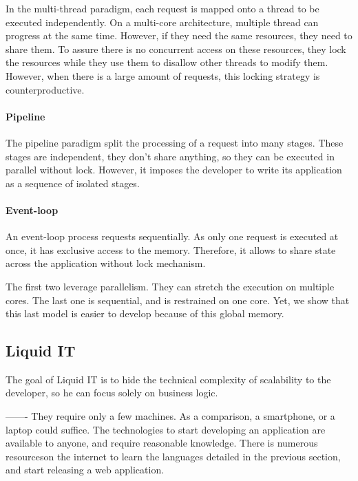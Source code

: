 In the multi-thread paradigm, each request is mapped onto a thread to be executed independently.
On a multi-core architecture, multiple thread can progress at the same time.
However, if they need the same resources, they need to share them.
To assure there is no concurrent access on these resources, they lock the resources while they use them to disallow other threads to modify them.
However, when there is a large amount of requests, this locking strategy is counterproductive.

\paragraph{Pipeline} %

The pipeline paradigm split the processing of a request into many stages.
These stages are independent, they don't share anything, so they can be executed in parallel without lock.
However, it imposes the developer to write its application as a sequence of isolated stages.

\paragraph{Event-loop}

An event-loop process requests sequentially.
As only one request is executed at once, it has exclusive access to the memory.
Therefore, it allows to share state across the application without lock mechanism.


The first two leverage parallelism.
They can stretch the execution on multiple cores.
The last one is sequential, and is restrained on one core.
Yet, we show that this last model is easier to develop because of this global memory.






\subsection{Liquid IT}

The goal of Liquid IT is to hide the technical complexity of scalability to the developer, so he can focus solely on business logic.




-------
They require only a few machines.
As a comparison, a smartphone, or a laptop could suffice.
The technologies to start developing an application are available to anyone, and require reasonable knowledge.
There is numerous resourceson the internet to learn the languages detailed in the previous section, and start releasing a web application.

